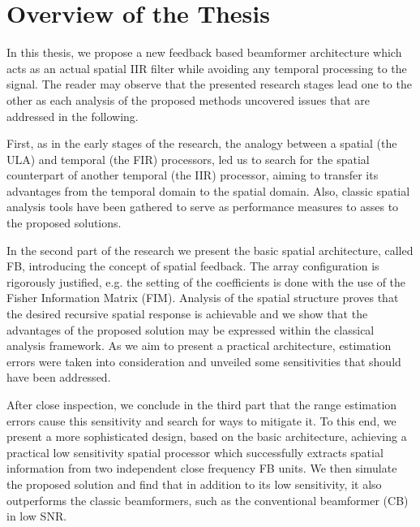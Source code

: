 \section{Overview of the Thesis}
In this thesis, we propose a new feedback based beamformer architecture which acts as an actual spatial IIR filter while avoiding any temporal processing to the signal.
The reader may observe that the presented research stages lead one to the other as each analysis of the proposed methods uncovered issues that are addressed in the following.
\par
First, as in the early stages of the research, the analogy between a spatial (the ULA) and temporal (the FIR) processors, led us to search for the spatial counterpart of another temporal (the IIR) processor, aiming to transfer its advantages from the temporal domain to the spatial domain.
Also, classic spatial analysis tools have been gathered to serve as performance measures to asses to the proposed solutions.
\par
In the second part of the research we present the basic spatial architecture, called FB, introducing the concept of spatial feedback.
The array configuration is rigorously justified, e.g. the setting of the coefficients is done with the use of the Fisher Information Matrix (FIM).
Analysis of the spatial structure proves that the desired recursive spatial response is achievable and we show that the advantages of the proposed solution may be expressed within the classical analysis framework.
As we aim to present a practical architecture, estimation errors were taken into consideration and unveiled some sensitivities that should have been addressed.
\par
After close inspection, we conclude in the third part that the range estimation errors cause this sensitivity and search for ways to mitigate it.
To this end, we present a more sophisticated design, based on the basic architecture, achieving a practical low sensitivity spatial processor which successfully extracts spatial information from two independent close frequency FB units.
We then simulate the proposed solution and find that in addition to its low sensitivity, it also outperforms the classic beamformers, such as the conventional beamformer (CB) in low SNR. 
